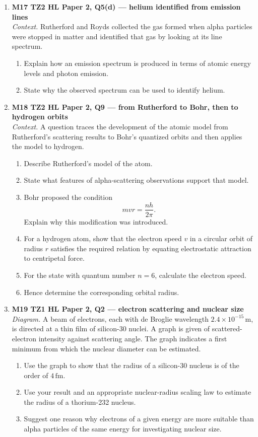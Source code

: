 \documentclass[11pt]{article}
\begin{document}
\begin{enumerate}[leftmargin=*, itemsep=1.1em]

\item \textbf{M17 TZ2 HL Paper 2, Q5(d) --- helium identified from emission lines}\\
\textit{Context.} Rutherford and Royds collected the gas formed when alpha particles were stopped in matter and identified that gas by looking at its line spectrum.
\begin{enumerate}[label=(\alph*)]
\item Explain how an emission spectrum is produced in terms of atomic energy levels and photon emission.
\item State why the observed spectrum can be used to identify helium.
\end{enumerate}

\item \textbf{M18 TZ2 HL Paper 2, Q9 --- from Rutherford to Bohr, then to hydrogen orbits}\\
\textit{Context.} A question traces the development of the atomic model from Rutherford's scattering results to Bohr's quantized orbits and then applies the model to hydrogen.
\begin{enumerate}[label=(\alph*)]
\item Describe Rutherford's model of the atom.
\item State what features of alpha-scattering observations support that model.
\item Bohr proposed the condition
\[
mvr=\frac{nh}{2\pi}.
\]
Explain why this modification was introduced.
\item For a hydrogen atom, show that the electron speed $v$ in a circular orbit of radius $r$ satisfies the required relation by equating electrostatic attraction to centripetal force.
\item For the state with quantum number $n=6$, calculate the electron speed.
\item Hence determine the corresponding orbital radius.
\end{enumerate}

\item \textbf{M19 TZ1 HL Paper 2, Q2 --- electron scattering and nuclear size}\\
\textit{Diagram.} A beam of electrons, each with de Broglie wavelength $2.4\times10^{-15}\,\text{m}$, is directed at a thin film of silicon-30 nuclei. A graph is given of scattered-electron intensity against scattering angle. The graph indicates a first minimum from which the nuclear diameter can be estimated.
\begin{enumerate}[label=(\alph*)]
\item Use the graph to show that the radius of a silicon-30 nucleus is of the order of $4\,\text{fm}$.
\item Use your result and an appropriate nuclear-radius scaling law to estimate the radius of a thorium-232 nucleus.
\item Suggest one reason why electrons of a given energy are more suitable than alpha particles of the same energy for investigating nuclear size.
\end{enumerate}


\end{enumerate}
\end{document}
